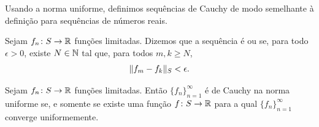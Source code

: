 Usando a norma uniforme, definimos sequências de Cauchy de modo semelhante
à definição para sequências de números reais.

\begin{defn}
Sejam $f_n \colon S \to {\mathbb{R}}$ funções limitadas.
Dizemos que a sequência é \emph{}
ou \emph{}
se, para todo $\epsilon > 0$, existe $N \in {\mathbb{N}}$ tal que, para todos
$m,k \geq N$,
\begin{equation*}
\lVert {f_m-f_k} \rVert_S < \epsilon .
\end{equation*}
\end{defn}

\begin{prop} \label{prop:uniformcauchy}
Sejam $f_n \colon S \to {\mathbb{R}}$ funções limitadas.
Então $\{ f_n \}_{n=1}^\infty$ é de Cauchy na norma uniforme se, e somente
se existe uma função $f \colon S \to {\mathbb{R}}$ para a qual
$\{ f_n \}_{n=1}^\infty$ converge uniformemente.
\end{prop}

